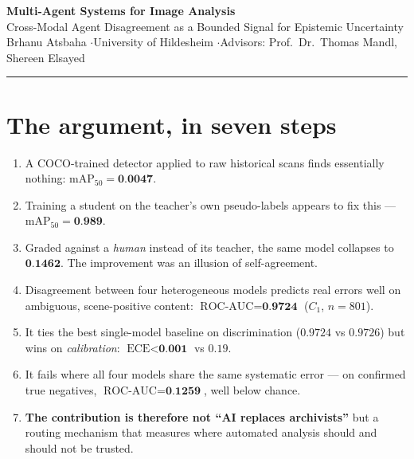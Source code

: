 \documentclass[10pt,a4paper]{article}
\newcommand{\num}[1]{\textbf{#1}}
\begin{document}
\begin{center}
{\Large\bfseries Multi-Agent Systems for Image Analysis}\\[1mm]
{\normalsize Cross-Modal Agent Disagreement as a Bounded Signal for Epistemic Uncertainty}\\[2mm]
{\footnotesize\color{PrismGray} Brhanu Atsbaha \quad$\cdot$\quad University of Hildesheim \quad$\cdot$\quad Advisors: Prof.\ Dr.\ Thomas Mandl, Shereen Elsayed}
\end{center}
\vspace{-2mm}
\rule{\textwidth}{0.8pt}

\section{The argument, in seven steps}
\begin{enumerate}[leftmargin=1.4em, itemsep=2pt, topsep=3pt]
  \item A COCO-trained detector applied to raw historical scans finds essentially nothing: $\text{mAP}_{50}=\num{0.0047}$.
  \item Training a student on the teacher's own pseudo-labels appears to fix this --- $\text{mAP}_{50}=\num{0.989}$.
  \item Graded against a \emph{human} instead of its teacher, the same model collapses to $\num{0.1462}$. The improvement was an illusion of self-agreement.
  \item Disagreement between four heterogeneous models predicts real errors well on ambiguous, scene-positive content: $\text{ROC-AUC}=\num{0.9724}$ ($C_1$, $n=801$).
  \item It ties the best single-model baseline on discrimination ($0.9724$ vs $0.9726$) but wins on \emph{calibration}: $\text{ECE}<\num{0.001}$ vs $0.19$.
  \item It fails where all four models share the same systematic error --- on confirmed true negatives, $\text{ROC-AUC}=\num{0.1259}$, well below chance.
  \item \textbf{The contribution is therefore not ``AI replaces archivists''} but a routing mechanism that measures where automated analysis should and should not be trusted.
\end{enumerate}
\end{document}
